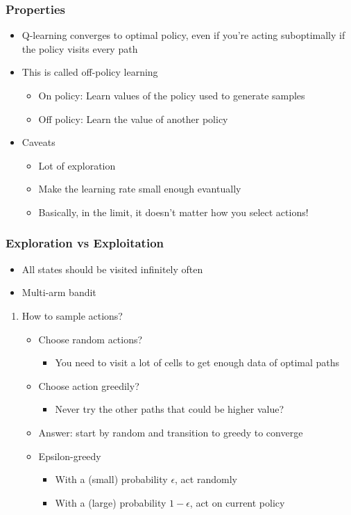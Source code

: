 \documentclass[11pt]{article}
\begin{document}
\subsubsection{Properties}
\label{sec:org38d30b7}
\begin{itemize}
\item Q-learning converges to optimal policy, even if you're acting suboptimally if the policy visits every path
\item This is called off-policy learning
\begin{itemize}
\item On policy: Learn values of the policy used to generate samples
\item Off policy: Learn the value of another policy
\end{itemize}
\item Caveats
\begin{itemize}
\item Lot of exploration
\item Make the learning rate small enough evantually
\item Basically, in the limit, it doesn't matter how you select actions!
\end{itemize}
\end{itemize}
\subsubsection{Exploration vs Exploitation}
\label{sec:orgfb89b01}
\begin{itemize}
\item All states should be visited infinitely often
\item Multi-arm bandit
\end{itemize}
\begin{enumerate}
\item How to sample actions?
\label{sec:orgcb2b0fb}
\begin{itemize}
\item Choose random actions?
\begin{itemize}
\item You need to visit a lot of cells to get enough data of optimal paths
\end{itemize}
\item Choose action greedily?
\begin{itemize}
\item Never try the other paths that could be higher value?
\end{itemize}
\item Answer: start by random and transition to greedy to converge
\item Epsilon-greedy
\begin{itemize}
\item With a (small) probability \(\epsilon\), act randomly
\item With a (large) probability \(1-\epsilon\), act on current policy
\end{itemize}
\end{itemize}
\end{enumerate}
\end{document}
